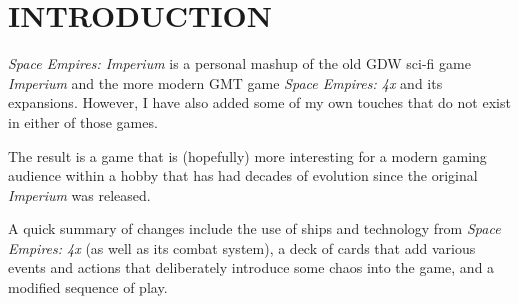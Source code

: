 \section{INTRODUCTION}
\hfill

\textit{Space Empires: Imperium} is a personal mashup of the old GDW sci-fi game \textit{Imperium} and the more modern GMT game \textit{Space Empires: 4x} and its expansions. However, I have also added some of my own touches that do not exist in either of those games.

The result is a game that is (hopefully) more interesting for a modern gaming audience within a hobby that has had decades of evolution since the original \textit{Imperium} was released.

A quick summary of changes include the use of ships and technology from \textit{Space Empires: 4x} (as well as its combat system), a deck of cards that add various events and actions that deliberately introduce some chaos into the game, and a modified sequence of play.